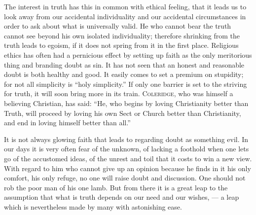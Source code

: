 \documentclass[12pt,a4paper,openany]{book}
\newcommand{\opage}[1]{\marginnote{\footnotesize\textit{[#1]}}}
\begin{document}
The interest in truth has this in common with ethical feeling, that it leads us to look away from our accidental
individuality and our accidental circumstances in order to ask about what is universally valid. He who cannot bear the
truth cannot see beyond his own isolated individuality; therefore shrinking from the truth leads to egoism, if it does
not spring from it in the first place. Religious ethics has often had a pernicious effect by setting up faith as the
only meritorious thing and branding doubt as sin. It has not seen that an honest and reasonable doubt is both healthy
and good. It easily comes to set a premium on stupidity; for not all simplicity is ``holy simplicity.'' If only one
barrier is set to the striving for truth, it will soon bring more in its train. \textsc{Coleridge}, who was himself a
believing Christian, has said: ``He, who begins by loving Christianity better than Truth, will proceed by loving his
own Sect or Church better than Christianity, and end in loving himself better than all.''%

\opage{257}It is not always glowing faith that leads to regarding doubt as something evil. In our days it is very
often fear of the unknown, of lacking a foothold when one lets go of the accustomed ideas, of the unrest and toil that
it costs to win a new view. With regard to him who cannot give up an opinion because he finds in it his only comfort,
his only refuge, no one will raise doubt and discussion. One should not rob the poor man of his one lamb. %
But from there it is a great leap to the assumption that what is truth depends on our need and our wishes, --- a leap
which is nevertheless made by many with astonishing ease.
\end{document}
